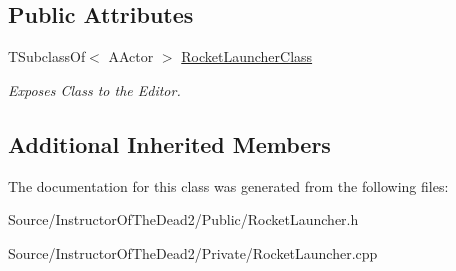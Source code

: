 \subsection*{Public Attributes}
\begin{DoxyCompactItemize}
\item 
\mbox{\label{class_a_rocket_launcher_a4974bb444bf93eb2c6d7d6e04e6ea4a0}} 
T\+Subclass\+Of$<$ A\+Actor $>$ \mbox{\hyperlink{class_a_rocket_launcher_a4974bb444bf93eb2c6d7d6e04e6ea4a0}{Rocket\+Launcher\+Class}}
\begin{DoxyCompactList}\small\item\em Exposes Class to the Editor. \end{DoxyCompactList}\end{DoxyCompactItemize}
\subsection*{Additional Inherited Members}


The documentation for this class was generated from the following files\+:\begin{DoxyCompactItemize}
\item 
Source/\+Instructor\+Of\+The\+Dead2/\+Public/Rocket\+Launcher.\+h\item 
Source/\+Instructor\+Of\+The\+Dead2/\+Private/Rocket\+Launcher.\+cpp\end{DoxyCompactItemize}
